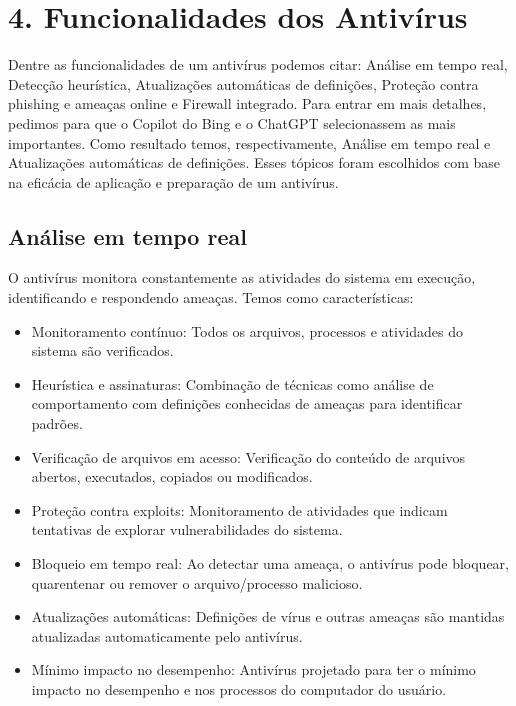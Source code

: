 \documentclass[10pt,conference,twocolumn]{article}
\begin{document}
\section* {4. Funcionalidades dos Antivírus}
Dentre as funcionalidades de um antivírus podemos citar: Análise em tempo real, Detecção heurística, Atualizações automáticas de definições, Proteção contra phishing e ameaças online e Firewall integrado. Para entrar em mais detalhes, pedimos para que o Copilot do Bing e o ChatGPT selecionassem as mais importantes. Como resultado temos, respectivamente, Análise em tempo real e Atualizações automáticas de definições. Esses tópicos foram escolhidos com base na eficácia de aplicação e preparação de um antivírus.
\subsection*{Análise em tempo real}
O antivírus monitora constantemente as atividades do sistema em execução, identificando e respondendo ameaças. Temos como características:
\begin{itemize}
\item
Monitoramento contínuo: Todos os arquivos, processos e atividades do sistema são verificados.
\item
Heurística e assinaturas: Combinação de técnicas como análise de comportamento com definições conhecidas de ameaças para identificar padrões.
\item
Verificação de arquivos em acesso: Verificação do conteúdo de arquivos abertos, executados, copiados ou modificados.
\item
Proteção contra exploits: Monitoramento de atividades que indicam tentativas de explorar vulnerabilidades do sistema.
\item
Bloqueio em tempo real: Ao detectar uma ameaça, o antivírus pode bloquear, quarentenar ou remover o arquivo/processo malicioso.
\item
Atualizações automáticas: Definições de vírus e outras ameaças são mantidas atualizadas automaticamente pelo antivírus.
\item
Mínimo impacto no desempenho: Antivírus projetado para ter o mínimo impacto no desempenho e nos processos do computador do usuário.
\end{itemize}
\end{document}
